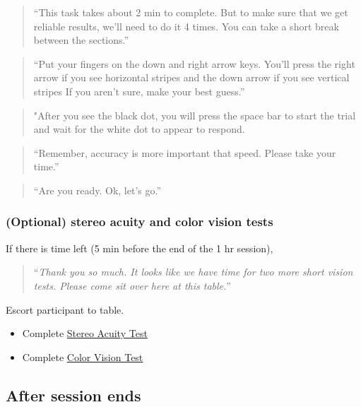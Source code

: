 \documentclass[]{article}
\providecommand{\tightlist}{%
  \setlength{\itemsep}{0pt}\setlength{\parskip}{0pt}}
\begin{document}
\begin{quote}
``This task takes about 2 min to complete. But to make sure that we get
reliable results, we'll need to do it 4 times. You can take a short
break between the sections.''
\end{quote}

\begin{quote}
``Put your fingers on the down and right arrow keys. You'll press the
right arrow if you see horizontal stripes and the down arrow if you see
vertical stripes If you aren't sure, make your best guess.''
\end{quote}

\begin{quote}
"After you see the black dot, you will press the space bar to start the
trial and wait for the white dot to appear to respond.
\end{quote}

\begin{quote}
``Remember, accuracy is more important that speed. Please take your
time.''
\end{quote}

\begin{quote}
``Are you ready. Ok, let's go.''
\end{quote}

\hypertarget{optional-stereo-acuity-and-color-vision-tests}{%
\subsubsection{(Optional) stereo acuity and color vision
tests}\label{optional-stereo-acuity-and-color-vision-tests}}

If there is time left (5 min before the end of the 1 hr session),

\begin{quote}
``\emph{Thank you so much. It looks like we have time for two more short
vision tests. Please come sit over here at this table.}''
\end{quote}

Escort participant to table.

\begin{itemize}
\tightlist
\item
  Complete \href{vision-screening-protocol.html}{Stereo Acuity Test}
\item
  Complete \href{vision-screening-protocol.html}{Color Vision Test}
\end{itemize}

\hypertarget{after-session-ends}{%
\subsection{After session ends}\label{after-session-ends}}
\end{document}
